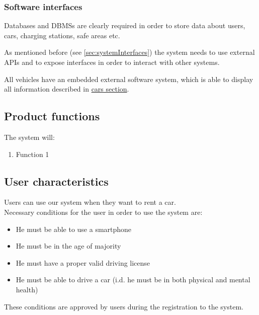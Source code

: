 \subsubsection{Software interfaces}
Databases and DBMSs are clearly required in order to store data about users, cars, charging stations, safe areas etc.

As mentioned before (see \autoref{sec:systemInterfaces}) the system needs to use external APIs and to expose interfaces in order to interact with other systems.

All vehicles have an embedded external software system, which is able to display all information described in \hyperref[sec:cars]{cars section}.

\subsection{Product functions}
	The system will:
	\begin{enumerate}[label=\textbf{F\arabic*.}]
		\item Function 1
	\end{enumerate}

\subsection{User characteristics}
	Users can use our system when they want to rent a car.\\
	Necessary conditions for the user in order to use the system are:
	\begin{itemize}
		\item He must be able to use a smartphone
		\item He must be in the age of majority
		\item He must have a proper valid driving license
		\item He must be able to drive a car (i.d. he must be in both physical and mental health)
	\end{itemize}
	These conditions are approved by users during the registration to the system.


